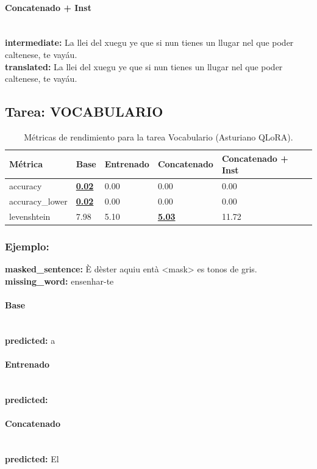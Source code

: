 \paragraph{Concatenado + Inst}~\\
\textbf{intermediate:} La llei del xuegu ye que si nun tienes un llugar nel que poder caltenese, te vayáu.\\
\textbf{translated:} La llei del xuegu ye que si nun tienes un llugar nel que poder caltenese, te vayáu.

\subsection{Tarea: VOCABULARIO}\label{tarea-vocabulario}
\begin{longtable}[]{@{}lllll@{}}
\toprule\noalign{}
Métrica & Base & Entrenado & Concatenado & Concatenado + Inst \\
\midrule\noalign{}
\endhead
\bottomrule\noalign{}
\caption{Métricas de rendimiento para la tarea Vocabulario (Asturiano QLoRA).}
\label{tab:metricas_vocabulario_Asturiano QLoRA}
\endlastfoot
accuracy & \textbf{\underline{0.02}} & 0.00 & 0.00 & 0.00 \\
accuracy\_lower & \textbf{\underline{0.02}} & 0.00 & 0.00 & 0.00 \\
levenshtein & 7.98 & 5.10 & \textbf{\underline{5.03}} & 11.72 \\
\end{longtable}

\subsubsection{Ejemplo:}
\textbf{masked\_sentence:} È d\textquotesingle{}èster aquiu entà {\textless}mask{\textgreater} es tonos de gris.\\
\textbf{missing\_word:} ensenhar-te

\paragraph{Base}~\\
\textbf{predicted:} a

\paragraph{Entrenado}~\\
\textbf{predicted:} 

\paragraph{Concatenado}~\\
\textbf{predicted:} El

